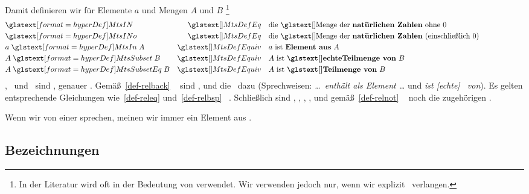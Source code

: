 Damit definieren wir für Elemente $a$ und Mengen $A$ und $B$%
\footnote{%
	In der Literatur wird \chrqt{\MtsSubset} oft in der Bedeutung von \chrqt{\MtsSubsetEq} verwendet.
	Wir verwenden \chrqt{\MtsSubset} jedoch nur, wenn wir explizit \Ungleichheit\ verlangen.
}
\begin{align}
	&   \defSym{\MtsIN}           & \MtsDefEq    \quad &
	\text{die \Menge\ der \defFt{natürlichen Zahlen}  ohne           $0$}
	\label{def-MtsIN}   \\
	&   \defSym{\MtsINo}          & \MtsDefEq    \quad &
	\text{die \Menge\ der \defFt{natürlichen Zahlen} (einschließlich $0$)}
	\label{def-MtsINo}  \\
	& a \defSymBin{\MtsIn}       A & \MtsDefEquiv \quad &
	\text{$a$ ist         \defFt{Element aus} $A$}
	\label{def-MtsIn} \\
	& A \defSymBin{\MtsSubset}   B & \MtsDefEquiv \quad &
	\text{$A$ ist \defFt{\echteTeilmenge\ von} $B$}
	\label{def-MtsSub}   \\
	& A \defSymBin{\MtsSubsetEq} B & \MtsDefEquiv \quad &
	\text{$A$ ist  \defFt     {\Teilmenge\ von} $B$}
	\label{def-MtsSubeq} \formulatoleft
\end{align}
\MtsIn, \MtsSubset\ und \MtsSubsetEq\ sind \Relationen, genauer .
Gemäß~\eqref{def-relback} \pagename~\pageref{def-relback} sind ,  und  die \Umkehrrelationen\ dazu (Sprechweisen: \emph{\dots\ enthält als Element \dots} und \emph{ist [echte] \Obermenge\ von}).
Es gelten entsprechende Gleichungen wie~\eqref{def-releq} und~\eqref{def-relbsp} \pagename~\pageref{def-releq}.
Schließlich sind , , , ,  und  gemäß~\eqref{def-relnot} \pagename~\pageref{def-relnot} noch die zugehörigen \Negationen.

Wenn wir von einer  sprechen, meinen wir immer ein Element aus \MtsINo.

\subsection{Bezeichnungen}%
\label {sub-Bezeichnungen}

